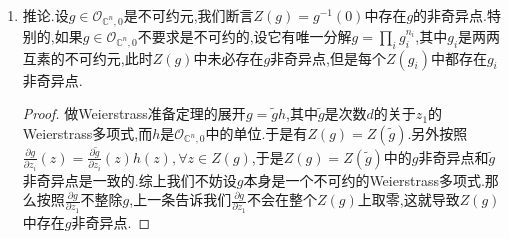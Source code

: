 \begin{enumerate}
\begin{proof}
    	按照$g$是不可约元,并且$\frac{\partial g}{\partial z_1}$的次数是$d-1$,我们可以找到$h_1,h_2\in\mathscr{O}_{\mathbb{C}^{n-1},0}[z_1]$使得$h_1g+h_2\frac{\partial g}{\partial z_1}$不含$z_1$(或者说它是$\mathscr{O}_{\mathbb{C}^{n-1},0}[z_1]$中的非零常数),把它记作$\gamma$,那么如果$w\in\mathbb{C}^{n-1}$满足$g_w$的零点$\xi$的重数$>1$,那么有$\gamma(w)=h_1(\xi,w)g_w(\xi)+h_2(\xi,w)\frac{\partial g}{\partial z_1}(\xi)=0$,于是$S$落在非常值全纯函数$\gamma$的零点集中,完成证明.
    \end{proof}
    \item 推论.设$g\in\mathscr{O}_{\mathbb{C}^n,0}$是不可约元,我们断言$Z(g)=g^{-1}(0)$中存在$g$的非奇异点.特别的,如果$g\in\mathscr{O}_{\mathbb{C}^n,0}$不要求是不可约的,设它有唯一分解$g=\prod_ig_i^{n_i}$,其中$g_i$是两两互素的不可约元,此时$Z(g)$中未必存在$g$非奇异点,但是每个$Z(g_i)$中都存在$g_i$非奇异点.
    \begin{proof}
    	
    	做Weierstrass准备定理的展开$g=\widetilde{g}h$,其中$\widetilde{g}$是次数$d$的关于$z_1$的Weierstrass多项式,而$h$是$\mathscr{O}_{\mathbb{C}^n,0}$中的单位.于是有$Z(g)=Z(\widetilde{g})$.另外按照$\frac{\partial g}{\partial z_i}(z)=\frac{\partial\widetilde{g}}{\partial z_i}(z)h(z),\forall z\in Z(g)$,于是$Z(g)=Z(\widetilde{g})$中的$g$非奇异点和$\widetilde{g}$非奇异点是一致的.综上我们不妨设$g$本身是一个不可约的Weierstrass多项式.那么按照$\frac{\partial g}{\partial z_1}$不整除$g$,上一条告诉我们$\frac{\partial g}{\partial z_1}$不会在整个$Z(g)$上取零,这就导致$Z(g)$中存在$g$非奇异点.
    \end{proof}
\end{enumerate}


